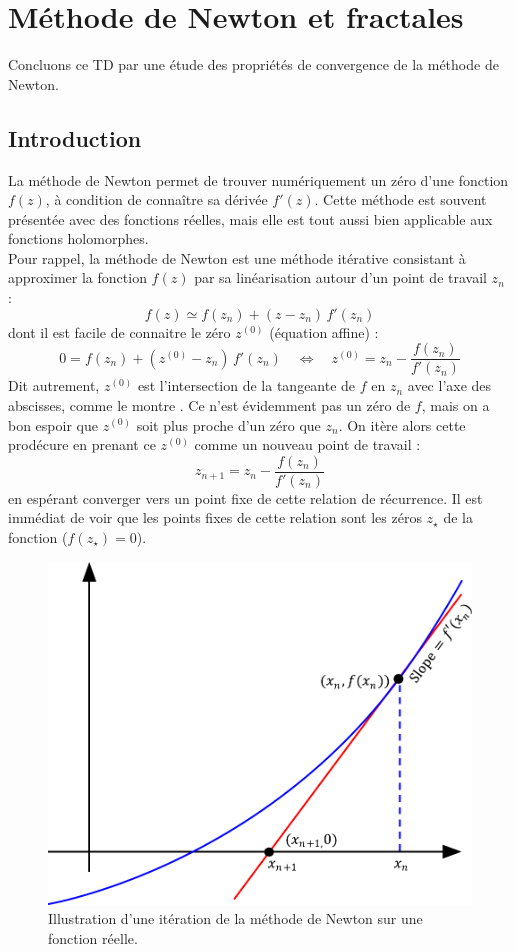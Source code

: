 \documentclass{book}
\begin{document}

\section{Méthode de Newton et fractales}

Concluons ce TD par une étude des propriétés de convergence de la méthode de Newton.\\

\subsection{Introduction}

La méthode de Newton permet de trouver numériquement un zéro d'une fonction $f(z)$, à condition de connaître sa dérivée $f'(z)$. Cette méthode est souvent présentée avec des fonctions réelles, mais elle est tout aussi bien applicable aux fonctions holomorphes.\\

Pour rappel, la méthode de Newton est une méthode itérative consistant à approximer la fonction $f(z)$ par sa linéarisation autour d'un point de travail $z_n$ :
\begin{equation*}
f(z) \simeq f(z_n) + (z-z_n)\,f'(z_n)
\end{equation*}
dont il est facile de connaitre le zéro $z^{(0)}$ (équation affine) :
\begin{equation*}
0 = f(z_n) + (z^{(0)} - z_n)\,f'(z_n) \quad \Leftrightarrow \quad z^{(0)} = z_n - \frac{f(z_n)}{f'(z_n)}
\end{equation*}
Dit autrement, $z^{(0)}$ est l'intersection de la tangeante de $f$ en $z_n$ avec l'axe des abscisses, comme le montre . Ce n'est évidemment pas un zéro de $f$, mais on a bon espoir que $z^{(0)}$ soit plus proche d'un zéro que $z_n$. On itère alors cette prodécure en prenant ce $z^{(0)}$ comme un nouveau point de travail :
\begin{equation*}
z_{n+1} = z_n - \frac{f(z_n)}{f'(z_n)}
\end{equation*}
en espérant converger vers un point fixe de cette relation de récurrence. Il est immédiat de voir que les points fixes de cette relation sont les zéros $z_\star$ de la fonction ($f(z_\star)=0$).

\begin{figure}[h!]
\centering
\includegraphics[width=0.5\linewidth]{TD2/newton_iteration.pdf}
\caption{Illustration d'une itération de la méthode de Newton sur une fonction réelle.}
\end{figure}
\end{document}

